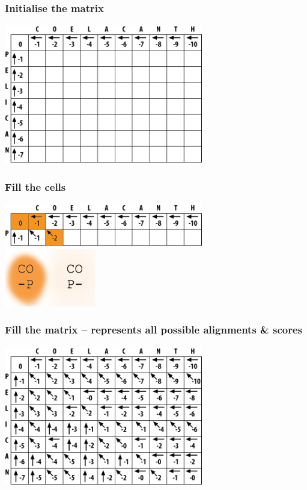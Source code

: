 \documentclass[table]{beamer}
\begin{document}
    \begin{frame}
     \frametitle{Initialise the matrix}
       \begin{center}
         \includegraphics[width=0.65\textwidth]{images/initialise}
       \end{center}
    \end{frame}   
   
    \begin{frame}
     \frametitle{Fill the cells}
       \begin{center}
         \includegraphics[width=0.65\textwidth]{images/fill_start} \\
         \includegraphics[width=0.3\textwidth]{images/fill_start_letters}
       \end{center}
    \end{frame}     

    \begin{frame}
     \frametitle{Fill the matrix -- represents all possible alignments \& scores}
       \begin{center}
         \includegraphics[width=0.65\textwidth]{images/full_matrix}
       \end{center}
    \end{frame}  
   
\end{document}
